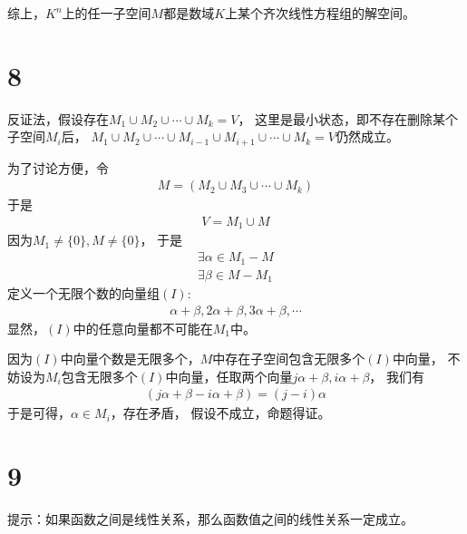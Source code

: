 \documentclass{article}
\begin{document}
综上，$K^n$上的任一子空间$M$都是数域$K$上某个齐次线性方程组的解空间。

\section*{8}

反证法，假设存在$M_1 \cup M_2 \cup \cdots \cup M_k = V$，
这里是最小状态，即不存在删除某个子空间$M_i$后，
$M_1 \cup M_2 \cup \cdots \cup M_{i - 1} \cup M_{i + 1} \cup \cdots \cup M_k = V$仍然成立。

为了讨论方便，令
\begin{align*}
  M = (M_2 \cup M_3 \cup \cdots \cup M_k)
\end{align*}
于是
\begin{align*}
  V = M_1 \cup M
\end{align*}
因为$M_1 \neq \{0\}, M \neq \{0\}$，
于是
\begin{align*}
  \exists \alpha \in M_1 - M \\
  \exists \beta \in M - M_1
\end{align*}
定义一个无限个数的向量组$(I)$:
\begin{align*}
  \alpha + \beta, 2\alpha + \beta, 3\alpha + \beta, \cdots
\end{align*}
显然，$(I)$中的任意向量都不可能在$M_1$中。

因为$(I)$中向量个数是无限多个，$M$中存在子空间包含无限多个$(I)$中向量，
不妨设为$M_i$包含无限多个$(I)$中向量，任取两个向量$j\alpha + \beta, i\alpha + \beta$，
我们有
\begin{align*}
  (j\alpha + \beta - i\alpha + \beta)
  = (j - i)\alpha
\end{align*}
于是可得，$\alpha \in M_i$，存在矛盾，
假设不成立，命题得证。

\section*{9}

提示：如果函数之间是线性关系，那么函数值之间的线性关系一定成立。
\end{document}
